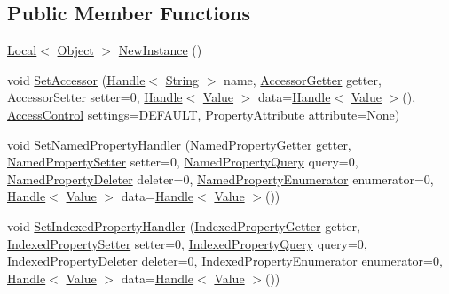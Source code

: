 \subsection*{Public Member Functions}
\begin{DoxyCompactItemize}
\item 
\hyperlink{classv8_1_1_local}{Local}$<$ \hyperlink{classv8_1_1_object}{Object} $>$ \hyperlink{classv8_1_1_object_template_ad25d8ebf37b1a3aaf7d4a03b1a9bd5c1}{New\+Instance} ()
\item 
void \hyperlink{classv8_1_1_object_template_a944ce96b6b65d571f8d682407b70d484}{Set\+Accessor} (\hyperlink{classv8_1_1_handle}{Handle}$<$ \hyperlink{classv8_1_1_string}{String} $>$ name, \hyperlink{namespacev8_a3016fe071826349d1370a700e71be094}{Accessor\+Getter} getter, Accessor\+Setter setter=0, \hyperlink{classv8_1_1_handle}{Handle}$<$ \hyperlink{classv8_1_1_value}{Value} $>$ data=\hyperlink{classv8_1_1_handle}{Handle}$<$ \hyperlink{classv8_1_1_value}{Value} $>$(), \hyperlink{namespacev8_a31d8355cb043d7d2dda3f4a52760b64e}{Access\+Control} settings=D\+E\+F\+A\+U\+L\+T, Property\+Attribute attribute=None)
\item 
void \hyperlink{classv8_1_1_object_template_aa80e9db593d8b954c4153082dc7a439d}{Set\+Named\+Property\+Handler} (\hyperlink{namespacev8_ab9effde41da1c073eddbd4a11a62bd0b}{Named\+Property\+Getter} getter, \hyperlink{namespacev8_a682b1fc46feab32605c4905612ffe870}{Named\+Property\+Setter} setter=0, \hyperlink{namespacev8_a0136e8102c101d9a39497f75daa9153b}{Named\+Property\+Query} query=0, \hyperlink{namespacev8_a7899471fae82b252750b81f41d5c1e26}{Named\+Property\+Deleter} deleter=0, \hyperlink{namespacev8_acbd04b83708cb5a80e73e0396f176e58}{Named\+Property\+Enumerator} enumerator=0, \hyperlink{classv8_1_1_handle}{Handle}$<$ \hyperlink{classv8_1_1_value}{Value} $>$ data=\hyperlink{classv8_1_1_handle}{Handle}$<$ \hyperlink{classv8_1_1_value}{Value} $>$())
\item 
void \hyperlink{classv8_1_1_object_template_af436aeb8132068d3678246f31515ff5a}{Set\+Indexed\+Property\+Handler} (\hyperlink{namespacev8_abf3be19b5157493da3859987cc50c6ab}{Indexed\+Property\+Getter} getter, \hyperlink{namespacev8_a3ca53e294b9b695b3777af904ca942b6}{Indexed\+Property\+Setter} setter=0, \hyperlink{namespacev8_a4b360e915c7c5c1591e946f701d7cc28}{Indexed\+Property\+Query} query=0, \hyperlink{namespacev8_a3a7c18d62a0d1f2d12845051920be592}{Indexed\+Property\+Deleter} deleter=0, \hyperlink{namespacev8_a15ab299eff53946ab483b762a4cb20dc}{Indexed\+Property\+Enumerator} enumerator=0, \hyperlink{classv8_1_1_handle}{Handle}$<$ \hyperlink{classv8_1_1_value}{Value} $>$ data=\hyperlink{classv8_1_1_handle}{Handle}$<$ \hyperlink{classv8_1_1_value}{Value} $>$())

\end{DoxyCompactItemize}
